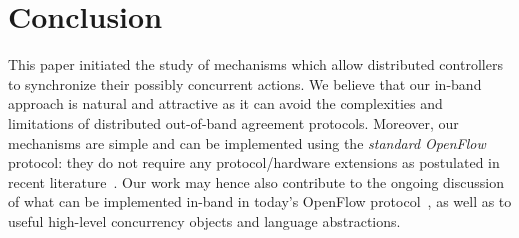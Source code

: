 \documentclass[conference]{sigcomm-alternate}
\begin{document}

\section{Conclusion}\label{sec:conclusion}

This paper initiated the study of mechanisms which allow distributed controllers 
to synchronize their possibly concurrent actions. We believe that our in-band 
approach is natural and attractive as it can avoid the 
complexities and limitations of distributed out-of-band agreement protocols.
Moreover, our mechanisms are simple and can be implemented using the \emph{standard OpenFlow}
protocol: they do not require any protocol/hardware extensions as postulated in recent literature~\cite{stn,netpaxos}.
Our work may hence also contribute to the ongoing discussion of what can be implemented
in-band in today's OpenFlow protocol~\cite{reclaim},
as well as to useful high-level concurrency objects and
language abstractions.~\cite{pyretic}

%
\end{document}
